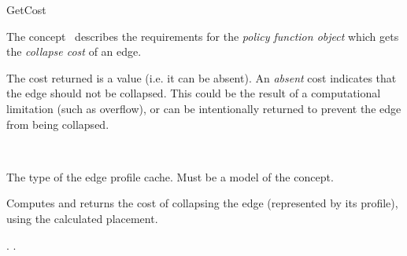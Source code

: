 
\begin{ccRefConcept}{GetCost}


\ccDefinition

The concept \ccRefName\ describes the requirements for the {\em policy function object} 
which gets the {\em collapse cost} of an edge.

The cost returned is a  value (i.e. it can be absent).
An {\em absent} cost indicates that the edge should not be collapsed.
This could be the result of a computational limitation (such as overflow),
or can be intentionally returned to prevent the edge from being collapsed.

\ccRefines
{}\\

\ccTypes
  {The type of the edge profile cache. Must be a model of the  concept.}{}
\ccGlue    
\ccGlue    
\ccGlue    

\ccCreation
{}  %


\ccOperations

  {Computes and returns the cost of collapsing the edge (represented by its profile),
   using the calculated placement.\\
  }
  
\ccHasModels
{}.
.

\end{ccRefConcept}

